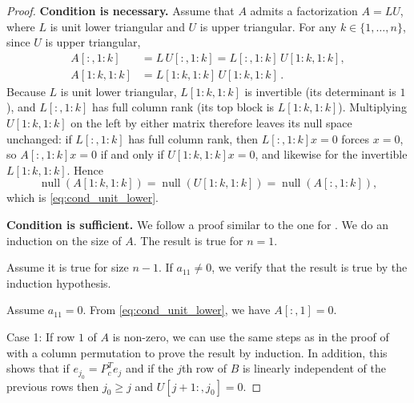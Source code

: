 \documentclass[10pt,twoside]{siamart1116}
\DeclareMathOperator{\nl}{null}
\numberwithin{theorem}{section}
\begin{document}
\begin{proof} \par
  \textbf{Condition is necessary.} \quad Assume that $A$ admits a factorization $A = LU$, where $L$ is unit lower triangular and $U$ is upper triangular. For any $k \in \{1, \dots, n\}$, since $U$ is upper triangular,
  \begin{align*}
    A[:, 1:k]   & = L\, U[:, 1:k] = L[:, 1:k]\, U[1:k, 1:k], \\
    A[1:k, 1:k] & = L[1:k, 1:k]\, U[1:k, 1:k] \,.
  \end{align*}
  Because $L$ is unit lower triangular, $L[1:k, 1:k]$ is invertible (its determinant is $1$), and $L[:, 1:k]$ has full column rank (its top block is $L[1:k, 1:k]$). Multiplying $U[1:k, 1:k]$ on the left by either matrix therefore leaves its null space unchanged: if $L[:, 1:k]$ has full column rank, then $L[:, 1:k] x = 0$ forces $x = 0$, so $A[:, 1:k] x = 0$ if and only if $U[1:k, 1:k] x = 0$, and likewise for the invertible $L[1:k, 1:k]$. Hence
  \[
    \nl(A[1:k, 1:k]) = \nl(U[1:k, 1:k]) = \nl(A[:, 1:k]),
  \]
  which is \cref{eq:cond_unit_lower}.

  \noindent\textbf{Condition is sufficient.} \quad We follow a proof similar to the one for . We do an induction on the size of $A$. The result is true for $n=1$.

  Assume it is true for size $n-1$. If $a_{11} \neq 0$, we verify that the result is true by the induction hypothesis.

  Assume $a_{11} = 0$. From \cref{eq:cond_unit_lower}, we have $A[:,1] = 0$.

  Case 1: If row $1$ of $A$ is non-zero, we can use the same steps as in the proof of  with a column permutation to prove the result by induction. In addition, this shows that if $e_{j_0} = P_c^T e_j$ and if the $j$th row of $B$ is linearly independent of the previous rows then $j_0 \ge j$ and $U[j+1:,j_0] = 0$.


\end{proof}
\end{document}
